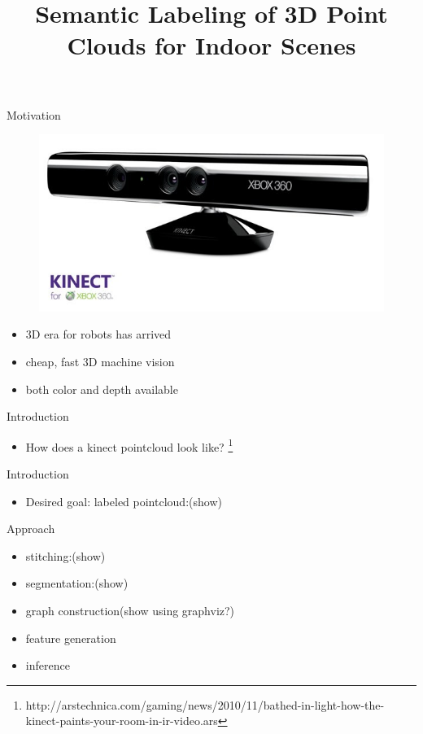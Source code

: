 \documentclass{beamer}
\title{Semantic Labeling of 3D Point Clouds for Indoor Scenes}
\begin{document}
\begin{frame}
\titlepage
\end{frame}

\begin{frame}{Motivation}
	\begin{figure}[t!]
		\includegraphics[width=.5\linewidth]{kinect.jpg}
	\end{figure}

	\begin{itemize}
		\item 3D era for robots has arrived 
		\item  cheap, fast 3D machine vision
		\item  both color and depth available
	\end{itemize}

\end{frame}

\begin{frame}{Introduction}
	\begin{itemize}
		\item How does a kinect pointcloud look like? \footnote{http://arstechnica.com/gaming/news/2010/11/bathed-in-light-how-the-kinect-paints-your-room-in-ir-video.ars}

	\end{itemize}
\end{frame}

\begin{frame}{Introduction}
	\begin{itemize}
		\item Desired goal: labeled pointcloud:(show)

	\end{itemize}
\end{frame}

\begin{frame}{Approach}
	\begin{itemize}
		\item stitching:(show)
		\item  segmentation:(show)
		\item  graph construction(show using graphviz?)
		\item  feature generation
		\item  inference
	\end{itemize}

\end{frame}
\end{document}
